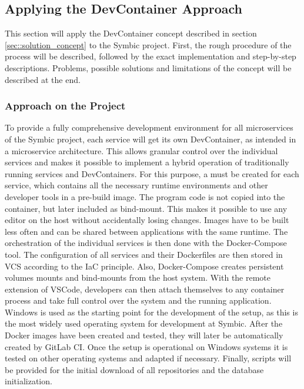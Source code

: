     \subsection{Applying the DevContainer Approach}\label{ssec::apply}
    This section will apply the DevContainer concept described in section \ref{sec::solution_concept} to the Symbic project. First, the rough procedure of the process will be described, followed by the exact implementation and step-by-step descriptions. Problems, possible solutions and limitations of the concept will be described at the end.

        \subsubsection{Approach on the Project}\label{ssec::imp_approach}
        To provide a fully comprehensive development environment for all microservices of the Symbic project, each service will get its own DevContainer, as intended in a microservice architecture. This allows granular control over the individual services and makes it possible to implement a hybrid operation of traditionally running services and DevContainers. For this purpose, a  must be created for each service, which contains all the necessary runtime environments and other developer tools in a pre-build image. The program code is not copied into the container, but later included as bind-mount. This makes it possible to use any editor on the host without accidentally losing changes. Images have to be built less often and can be shared between applications with the same runtime. The orchestration of the individual services is then done with the Docker-Compose tool. The configuration of all services and their Dockerfiles are then stored in \ac{VCS} according to the \ac{IaC} principle. Also, Docker-Compose creates persistent volumes mounts and bind-mounts from the host system. With the remote extension of \ac{VSCode}, developers can then attach themselves to any container process and take full control over the system and the running application.\newline
        Windows is used as the starting point for the development of the setup, as this is the most widely used operating system for development at Symbic. After the Docker images have been created and tested, they will later be automatically created by GitLab \ac{CI}. Once the setup is operational on Windows systems it is tested on other operating systems and adapted if necessary. Finally, scripts will be provided for the initial download of all repositories and the database initialization.

